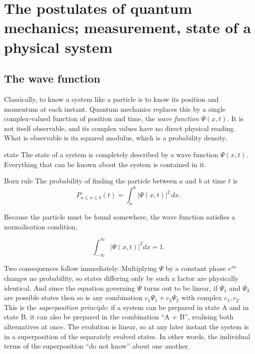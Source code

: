 \section{The postulates of quantum mechanics; measurement, state of a physical system}
\label{sec:postulates}

    \subsection{The wave function}

        Classically, to know a system like a particle is to know its position and momentum at each instant. Quantum mechanics replaces this by a single complex-valued function of position and time, the \emph{wave function} $\Psi(x,t)$. It is not itself observable, and its complex values have no direct physical reading. What is observable is its squared modulus, which is a probability density.

        \begin{postulate}{state}
            The state of a system is completely described by a wave function $\Psi(x,t)$. Everything that can be known about the system is contained in it.
        \end{postulate}

        \begin{postulate}{Born rule}
            The probability of finding the particle between $a$ and $b$ at time $t$ is
            \begin{equation}\label{eq:born-position}
                P_{a \le x \le b}\left(t\right) = \int^{b}_{a}|\Psi(x,t)|^{2}\,dx .
            \end{equation}
        \end{postulate}

        Because the particle must be found somewhere, the wave function satisfies a normalisation condition,

        \begin{equation*}
            \int^{\infty}_{-\infty}|\Psi(x,t)|^{2}dx = 1 .
        \end{equation*}

        Two consequences follow immediately. Multiplying $\Psi$ by a constant phase $e^{i\alpha}$ changes no probability, so states differing only by such a factor are physically identical. And since the equation governing $\Psi$ turns out to be linear, if $\Psi_{1}$ and $\Psi_{2}$ are possible states then so is any combination $c_{1}\Psi_{1} + c_{2}\Psi_{2}$ with complex $c_{1}, c_{2}$. This is the \emph{superposition principle}: if a system can be prepared in state A and in state B, it can also be prepared in the combination ``A + B'', realising both alternatives at once. The evolution is linear, so at any later instant the system is in a superposition of the separately evolved states. In other words, the individual terms of the superposition ``do not know'' about one another.

